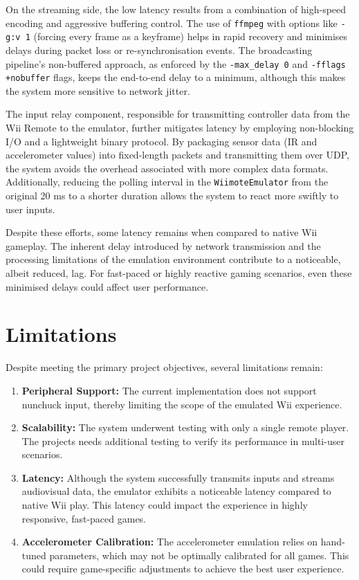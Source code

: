 On the streaming side, the low latency results from a combination of
high-speed encoding and aggressive buffering control. The use of \texttt{ffmpeg}
with options like \texttt{-g:v 1} (forcing every frame as a keyframe) helps in
rapid recovery and minimises delays during packet loss or re-synchronisation
events. The broadcasting pipeline’s non-buffered approach, as enforced by the
\texttt{-max\_delay 0} and \texttt{-fflags +nobuffer} flags, keeps the
end-to-end delay to a minimum, although this makes the system more
sensitive to network jitter.

The input relay component, responsible for transmitting controller data from the
Wii Remote to the emulator, further mitigates latency by employing non-blocking
I/O and a lightweight binary protocol. By packaging sensor data (IR and
accelerometer values) into fixed-length packets and transmitting them over UDP,
the system avoids the overhead associated with more complex data formats.
Additionally, reducing the polling interval in the \texttt{WiimoteEmulator} from
the original 20 ms to a shorter duration allows the system to react more swiftly
to user inputs.

Despite these efforts, some latency remains when compared to native Wii
gameplay. The inherent delay introduced by network transmission and the
processing limitations of the emulation environment contribute to a noticeable,
albeit reduced, lag. For fast-paced or highly reactive gaming scenarios, even
these minimised delays could affect user performance.

\section{Limitations}

Despite meeting the primary project objectives, several limitations remain:

\begin{enumerate}
	\item \textbf{Peripheral Support:}
	      The current implementation does not support nunchuck input, thereby limiting the scope of the emulated Wii experience.
	\item \textbf{Scalability:}
	      The system underwent testing with only a single remote player. The projects needs additional testing to verify its performance in multi-user scenarios.
	\item \textbf{Latency:}
	      Although the system successfully transmits inputs and streams audiovisual data, the emulator exhibits a noticeable latency compared to native Wii play. This latency could impact the experience in highly responsive, fast-paced games.
	\item \textbf{Accelerometer Calibration:}
	      The accelerometer emulation relies on hand-tuned parameters, which may not be optimally calibrated for all games. This could require game-specific adjustments to achieve the best user experience.
\end{enumerate}

